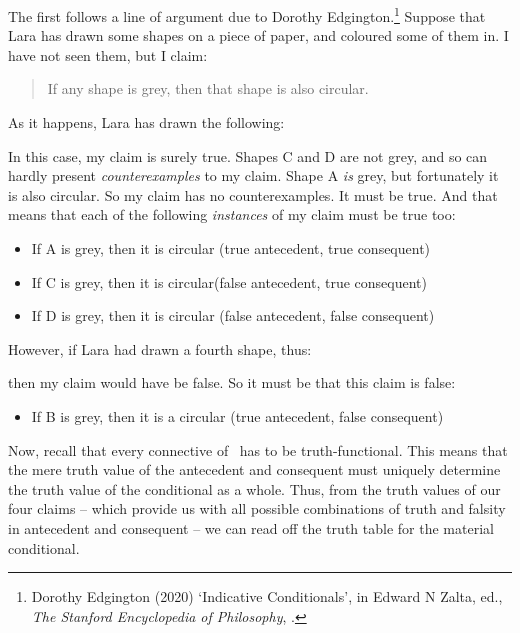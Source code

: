 The first follows a line of argument due to Dorothy Edgington.\footnote{Dorothy Edgington (2020) `Indicative Conditionals', in Edward N Zalta, ed., \emph{The Stanford Encyclopedia of Philosophy}, .}  Suppose that Lara has drawn some shapes on a piece of paper, and coloured some of them in. I have not seen them, but I claim:
	\begin{quote}
		If any shape is grey, then that shape is also circular.
	\end{quote}
As it happens, Lara has drawn the following:
\begin{center}
\end{center}
In this case, my claim is surely true.  Shapes C and D are not grey, and so can hardly present \emph{counterexamples} to my claim. Shape A \emph{is} grey, but fortunately it is also circular. So my claim has no counterexamples. It must be true. And that means that each of the following \emph{instances} of my claim must be true too:
	\begin{itemize}
		\item If A is grey, then it is circular \hfill (true antecedent, true consequent)
		\item If C is grey, then it is circular\hfill (false antecedent, true consequent)
		\item If D is grey, then it is circular \hfill (false antecedent, false consequent)
	\end{itemize}
However, if Lara had drawn a fourth shape, thus:
\begin{center}
\end{center}
then my claim would have be false. So it must be that this claim is false:
	\begin{itemize}
		\item If B is grey, then it is a circular \hfill (true antecedent, false consequent)
	\end{itemize}
Now, recall that every connective of \TFL\ has to be truth-functional. This means that the mere truth value of the antecedent and consequent must uniquely determine the truth value of the conditional as a whole. Thus, from the truth values of our four claims – which provide us with all possible combinations of truth and falsity in antecedent and consequent – we can read off the truth table for the material conditional.

